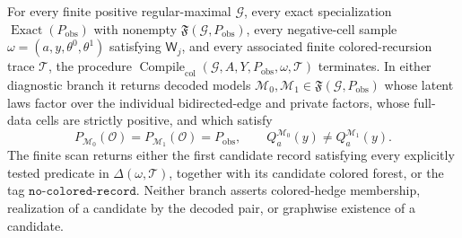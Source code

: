 For every finite positive regular-maximal \(\mathcal G\), every exact specialization \(\operatorname{Exact}(P_{\mathrm{obs}})\) with nonempty \(\mathfrak F(\mathcal G,P_{\mathrm{obs}})\), every negative-cell sample \(\omega=(a,y,\theta^0,\theta^1)\) satisfying \(\mathsf W_j\), and every associated finite colored-recursion trace \(\mathcal T\), the procedure \(\operatorname{Compile}_{\mathrm{col}}(\mathcal G,A,Y,P_{\mathrm{obs}},\omega,\mathcal T)\) terminates. In either diagnostic branch it returns decoded models \(\mathcal M_0,\mathcal M_1\in\mathfrak F(\mathcal G,P_{\mathrm{obs}})\) whose latent laws factor over the individual bidirected-edge and private factors, whose full-data cells are strictly positive, and which satisfy
\[
P_{\mathcal M_0}(\mathcal O)=P_{\mathcal M_1}(\mathcal O)=P_{\mathrm{obs}},
\qquad
Q_a^{\mathcal M_0}(y)\neq Q_a^{\mathcal M_1}(y).
\]
The finite scan returns either the first candidate record satisfying every explicitly tested predicate in \(\Delta(\omega,\mathcal T)\), together with its candidate colored forest, or the tag \(\mathtt{no\mbox{-}colored\mbox{-}record}\). Neither branch asserts colored-hedge membership, realization of a candidate by the decoded pair, or graphwise existence of a candidate.
